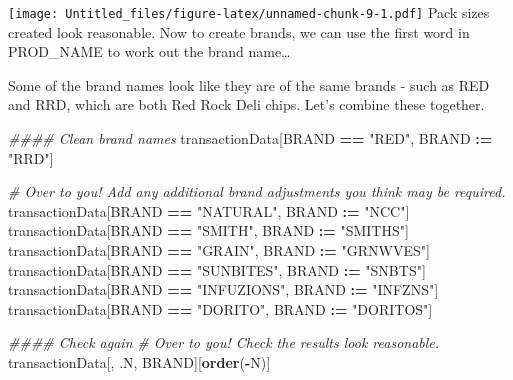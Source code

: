 \documentclass[]{article}
\newenvironment{Shaded}{\begin{snugshade}}{\end{snugshade}}
\newcommand{\CommentTok}[1]{\textcolor[rgb]{0.56,0.35,0.01}{\textit{#1}}}
\newcommand{\DecValTok}[1]{\textcolor[rgb]{0.00,0.00,0.81}{#1}}
\newcommand{\ErrorTok}[1]{\textcolor[rgb]{0.64,0.00,0.00}{\textbf{#1}}}
\newcommand{\KeywordTok}[1]{\textcolor[rgb]{0.13,0.29,0.53}{\textbf{#1}}}
\newcommand{\NormalTok}[1]{#1}
\newcommand{\OperatorTok}[1]{\textcolor[rgb]{0.81,0.36,0.00}{\textbf{#1}}}
\newcommand{\StringTok}[1]{\textcolor[rgb]{0.31,0.60,0.02}{#1}}
\begin{document}
\texttt{[image: Untitled\_files/figure-latex/unnamed-chunk-9-1.pdf]} Pack
sizes created look reasonable. Now to create brands, we can use the
first word in PROD\_NAME to work out the brand name\ldots{}

\begin{Shaded}
\end{Shaded}

Some of the brand names look like they are of the same brands - such as
RED and RRD, which are both Red Rock Deli chips. Let's combine these
together.

\begin{Shaded}
\begin{Highlighting}[]
\CommentTok{#### Clean brand names}
\NormalTok{transactionData[BRAND }\OperatorTok{==}\StringTok{ "RED"}\NormalTok{, BRAND }\OperatorTok{:}\ErrorTok{=}\StringTok{ "RRD"}\NormalTok{]}

\CommentTok{# Over to you! Add any additional brand adjustments you think may be required.}
\NormalTok{transactionData[BRAND }\OperatorTok{==}\StringTok{ "NATURAL"}\NormalTok{, BRAND }\OperatorTok{:}\ErrorTok{=}\StringTok{ "NCC"}\NormalTok{]}
\NormalTok{transactionData[BRAND }\OperatorTok{==}\StringTok{ "SMITH"}\NormalTok{, BRAND }\OperatorTok{:}\ErrorTok{=}\StringTok{ "SMITHS"}\NormalTok{]}
\NormalTok{transactionData[BRAND }\OperatorTok{==}\StringTok{ "GRAIN"}\NormalTok{, BRAND }\OperatorTok{:}\ErrorTok{=}\StringTok{ "GRNWVES"}\NormalTok{]}
\NormalTok{transactionData[BRAND }\OperatorTok{==}\StringTok{ "SUNBITES"}\NormalTok{, BRAND }\OperatorTok{:}\ErrorTok{=}\StringTok{ "SNBTS"}\NormalTok{]}
\NormalTok{transactionData[BRAND }\OperatorTok{==}\StringTok{ "INFUZIONS"}\NormalTok{, BRAND }\OperatorTok{:}\ErrorTok{=}\StringTok{ "INFZNS"}\NormalTok{]}
\NormalTok{transactionData[BRAND }\OperatorTok{==}\StringTok{ "DORITO"}\NormalTok{, BRAND }\OperatorTok{:}\ErrorTok{=}\StringTok{ "DORITOS"}\NormalTok{]}

\CommentTok{#### Check again}
\CommentTok{# Over to you! Check the results look reasonable.}
\NormalTok{transactionData[, .N, BRAND][}\KeywordTok{order}\NormalTok{(}\OperatorTok{-}\NormalTok{N)]}
\end{Highlighting}
\end{Shaded}
\end{document}
